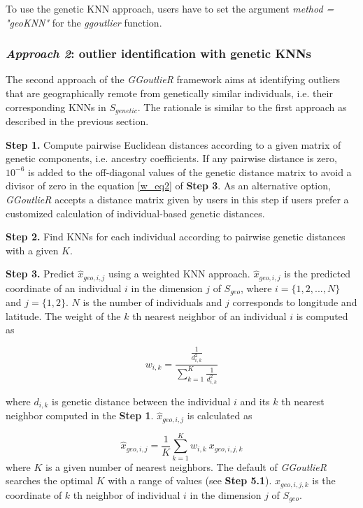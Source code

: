 \documentclass[11pt]{article}
\begin{document}
To use the genetic KNN approach, users have to set the argument \textit{method = "geoKNN"} for the \textit{ggoutlier} function.

\subsubsection*{\textit{Approach 2}: outlier identification with genetic KNNs}

The second approach of the \textit{GGoutlieR} framework aims at identifying outliers that are geographically remote from genetically similar individuals, i.e. their corresponding KNNs in $S_{genetic}$.
The rationale is similar to the first approach as described in the previous section.

\textbf{Step 1.} Compute pairwise Euclidean distances according to a given matrix of genetic components, i.e. ancestry coefficients.
If any pairwise distance is zero, $10^{-6}$ is added to the off-diagonal values of the genetic distance matrix to avoid a divisor of zero in the equation \ref{w_eq2} of \textbf{Step 3}. As an alternative option, \textit{GGoutlieR} accepts a distance matrix given by users in this step if users prefer a customized calculation of individual-based genetic distances.

\textbf{Step 2.} Find KNNs for each individual according to pairwise genetic distances with a given $K$.

\textbf{Step 3.} Predict $\hat{x}_{geo,i,j}$ using a weighted KNN approach.
$\hat{x}_{geo,i,j}$ is the predicted coordinate of an individual $i$ in the dimension $j$ of $S_{geo}$, where $i = \{1,2,...,N\}$ and $j = \{1,2\}$.
$N$ is the number of individuals and $j$ corresponds to longitude and latitude.
The weight of the $k$ th nearest neighbor of an individual $i$ is computed as

\begin{equation} \label{w_eq2}
w_{i,k}=\frac{\frac{1}{d_{i,k}^2}}{\sum_{k=1}^{K} \frac{1}{d_{i,k}^2}}
\end{equation}

where $d_{i,k}$ is genetic distance between the individual $i$ and its $k$ th nearest neighbor computed in the \textbf{Step 1}.
$\hat{x}_{geo,i,j}$ is calculated as

\begin{equation} \label{wknn_eq2}
\hat{x}_{geo,i,j}=\frac{1}{K}\sum_{k=1}^{K}w_{i,k}\ x_{geo,i,j,k}
\end{equation}
where $K$ is a given number of nearest neighbors.
The default of \textit{GGoutlieR} searches the optimal $K$ with a range of values (see \textbf{Step 5.1}).
$x_{geo,i,j,k}$ is the coordinate of $k$ th neighbor of individual $i$ in the dimension $j$ of $S_{geo}$.
\end{document}
